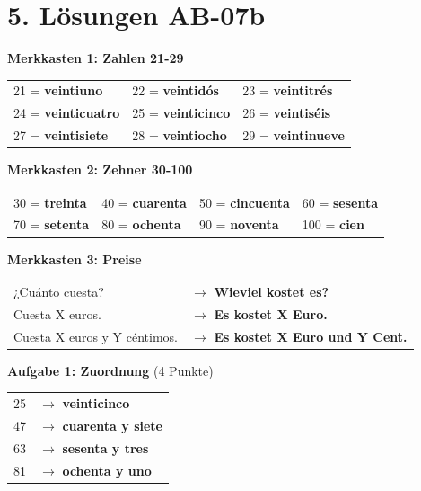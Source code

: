 \documentclass[11pt, a4paper]{article}
\newcommand{\sequenz}{07}
\newcommand{\block}{b}
\newcommand{\loesung}[1]{\textcolor{loesung}{\textbf{#1}}}
\begin{document}

\section*{5. Lösungen AB-\sequenz\block}

\textbf{Merkkasten 1: Zahlen 21-29}

\begin{tabular}{lll}
21 = \loesung{veintiuno} & 22 = \loesung{veintidós} & 23 = \loesung{veintitrés} \\
24 = \loesung{veinticuatro} & 25 = \loesung{veinticinco} & 26 = \loesung{veintiséis} \\
27 = \loesung{veintisiete} & 28 = \loesung{veintiocho} & 29 = \loesung{veintinueve} \\
\end{tabular}

\vspace{1em}

\textbf{Merkkasten 2: Zehner 30-100}

\begin{tabular}{llll}
30 = \loesung{treinta} & 40 = \loesung{cuarenta} & 50 = \loesung{cincuenta} & 60 = \loesung{sesenta} \\
70 = \loesung{setenta} & 80 = \loesung{ochenta} & 90 = \loesung{noventa} & 100 = \loesung{cien} \\
\end{tabular}

\vspace{1em}

\textbf{Merkkasten 3: Preise}

\begin{tabular}{ll}
¿Cuánto cuesta? & $\rightarrow$ \loesung{Wieviel kostet es?} \\
Cuesta X euros. & $\rightarrow$ \loesung{Es kostet X Euro.} \\
Cuesta X euros y Y céntimos. & $\rightarrow$ \loesung{Es kostet X Euro und Y Cent.} \\
\end{tabular}

\vspace{1em}

\textbf{Aufgabe 1: Zuordnung} (4 Punkte)

\begin{tabular}{ll}
25 & $\rightarrow$ \loesung{veinticinco} \\
47 & $\rightarrow$ \loesung{cuarenta y siete} \\
63 & $\rightarrow$ \loesung{sesenta y tres} \\
81 & $\rightarrow$ \loesung{ochenta y uno} \\
\end{tabular}
\end{document}
